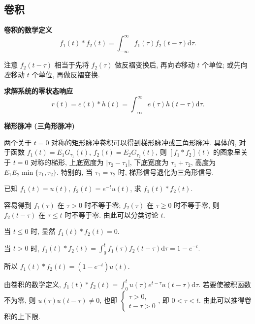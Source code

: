 \subsection{卷积} \label{2 卷积}

\textbf{卷积的数学定义}
\begin{equation} \label{eq:2.5 conv}
    f_1(t)*f_2(t)=\int_{-\infty}^{\infty}f_1(\tau)f_2(t-\tau)\mathrm{d}\tau.
\end{equation}

注意 $f_2(t-\tau)$ 相当于先将 $f_2(\tau)$ 做反褶变换后, 再向\textit{右}移动 $t$ 个单位; 或先向\textit{左}移动 $t$ 个单位, 再做反褶变换.

\textbf{求解系统的零状态响应}
\begin{equation} \label{eq:2.5 r zs conv}
    r(t)=e(t)*h(t)=\int_{-\infty}^{\infty}e(\tau)h(t-\tau)\mathrm{d}\tau.
\end{equation}

\textbf{梯形脉冲 (三角形脉冲)} \label{2.5 梯形脉冲 (三角形脉冲)}

两个关于 $t=0$ 对称的矩形脉冲卷积可以得到梯形脉冲或三角形脉冲. 具体的, 对于函数 $f_1(t)=E_1G_{\tau_1}(t)$, $f_2(t)=E_2G_{\tau_2}(t)$, 则 $[f_1*f_2](t)$ 的图象呈关于 $t=0$ 对称的梯形, 上底宽度为 $|\tau_2-\tau_1|$, 下底宽度为 $\tau_1+\tau_2$, 高度为 $E_1E_2\min\{\tau_1, \tau_2\}$. 特别的, 当 $\tau_1=\tau_2$ 时, 梯形信号退化为三角形信号.

\begin{exampleprob}
    已知 $f_1(t)=u(t)$, $f_2(t)=e^{-t}u(t)$, 求 $f_1(t)*f_2(t)$.

    \begin{solution}[1]
        容易得到 $f_1(\tau)$ 在 $\tau>0$ 时不等于零; $f_2(\tau)$ 在 $\tau\geq 0$ 时不等于零, 则 $f_2(t-\tau)$ 在 $\tau\leq t$ 时不等于零. 由此可以分类讨论 $t$.

        当 $t\leq 0$ 时, 显然 $f_1(t)*f_2(t)=0$.

        当 $t>0$ 时, $f_1(t)*f_2(t)=\displaystyle\int_{0}^{t}f_1(\tau)f_2(t-\tau)\mathrm{d}\tau=1-e^{-t}$.

        所以 $f_1(t)*f_2(t)=(1-e^{-t})u(t)$.
    \end{solution}

    \begin{solution}[2]
        由卷积的数学定义, $f_1(t)*f_2(t)=\displaystyle\int_{0}^{t}u(\tau)e^{t-\tau}u(t-\tau)\mathrm{d}\tau$. 若要使被积函数不为零, 则 $u(\tau)u(t-\tau)\neq 0$, 也即 $\begin{cases}
                \tau>0, \\
                t-\tau>0
            \end{cases}$, 即 $0<\tau<t$. 由此可以推得卷积的上下限.
    \end{solution}
\end{exampleprob}

